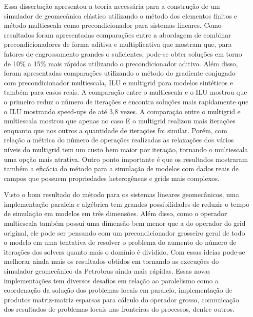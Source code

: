 
Essa dissertação apresentou a teoria necessária para a construção de um simulador de geomecânica elástico utilizando o método dos elementos finitos e método multiescala como precondicionador para sistemas lineares. Como resultados foram apresentadas comparações entre a abordagem de combinar precondicionadores de forma aditiva e multiplicativa que mostram que, para fatores de engrossamento grandes o suficientes, pode-se obter soluções em torno de 10\% a 15\%  mais rápidas utilizando o precondicionador aditivo. Além disso, foram apresentadas comparações utilizando o método do gradiente conjugado com precondicionador  multiescala, ILU e multigrid para modelos sintéticos e também para casos reais. A comparação entre o multiescala e o ILU mostrou que o primeiro reduz o número de iterações e encontra soluções mais rapidamente que o ILU mostrando speed-ups de até 3,8 vezes. A comparação entre o multigrid e multiescala mostrou que apenas no caso E o multigrid realizou mais iterações enquanto que nos outros a quantidade de iterações foi similar. Porém, com relação a métrica do número de operações realizadas as relaxações dos vários níveis do multigrid  tem um custo bem maior por iteração, tornando o multiescala uma opção mais atrativa.  Outro ponto importante é que os resultados mostraram também a eficácia do método para a simulação de modelos com dados reais de campos que possuem propriedades heterogêneas e grids mais complexos. 

Visto o bom resultado do método para os sistemas lineares geomecânicos, uma implementação paralela e algébrica tem grandes possibilidades de reduzir o tempo de simulação em modelos em três dimensões. Além disso, como o operador multiescala também possui uma dimensão bem menor que a do operador do grid original, ele pode ser pensando com um precondicionador grosseiro geral de todo o modelo em uma tentativa de resolver o problema do aumento do número de iterações dos solvers quanto mais o domínio é dividido. Com essas ideias pode-se melhorar ainda mais os resultados obtidos em \citet{geomecrio} tornando as execuções do simulador geomecânico da Petrobras ainda mais rápidas. Essas novas implementações tem diversos desafios em relação ao paralelismo como a coordenação da solução dos problemas locais em paralelo, implementação de produtos matriz-matriz esparsas para  cálculo do operador grosso, comunicação dos resultados de problemas locais nas fronteiras do processos, dentre outros.


